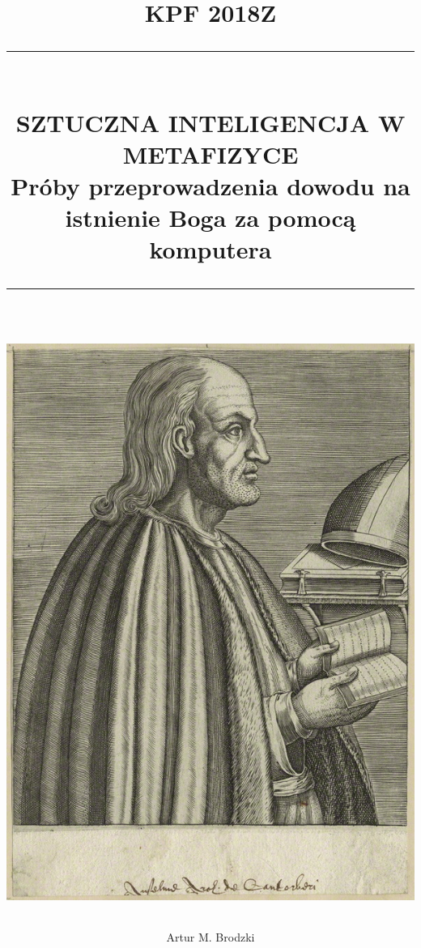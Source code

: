 \documentclass[12pt]{article}
\newcommand{\HRule}[1]{\rule{\linewidth}{#1}}
\begin{document}
\title{ \textsc{KPF 2018Z}
		\\ %
		\HRule{0.5pt} \\
		\LARGE \textbf{\uppercase{
		    Sztuczna inteligencja w metafizyce} \\ 
	    \normalsize Próby przeprowadzenia dowodu na istnienie Boga za pomocą komputera }
		\HRule{2pt} \\ [0.5cm]
		\includegraphics[width=0.5\linewidth]{anzelm.jpg}
		}


\author{Artur M. Brodzki }


\maketitle
\newpage
{}

\renewcommand\tablename{Tabela}

\newtheorem{theorem}{Twierdzenie}
\newtheorem{definition}{Definicja}
\newtheorem{axiom}{Aksjomat}
\newtheorem{axiom-g}{Aksjomat}
\newtheorem{definition-g}{Definicja}
\newtheorem{theorem-g}{Twierdzenie}
\newtheorem{lemma}{Lemat}
\newtheorem{corollary}{Fakt}

\sectionfont{\scshape}
\end{document}

